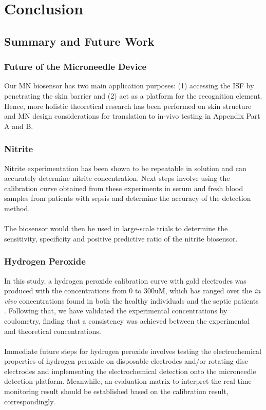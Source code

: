 \section{Conclusion}
\subsection{Summary and Future Work}
\subsubsection{Future of the Microneedle Device}
Our MN biosensor has two main application purposes: (1) accessing the ISF by penetrating the skin barrier and (2) act as a platform for the recognition element.  Hence, more holistic theoretical research has been performed on skin structure and MN design considerations for translation to in-vivo testing in Appendix Part A and B.
\subsubsection{Nitrite}
 Nitrite experimentation has been shown to be repeatable in solution and can accurately determine nitrite concentration. Next steps involve using the calibration curve obtained from these experiments in serum and fresh blood samples from patients with sepsis and determine the accuracy of the detection method.\\\\
 The biosensor would then be used in large-scale trials to determine the sensitivity, specificity and positive predictive ratio of the nitrite biosensor.
\subsubsection{Hydrogen Peroxide}
In this study, a hydrogen peroxide calibration curve with gold electrodes was produced with the concentrations from 0 to 300uM, which has ranged over the \textit{in vivo}  concentrations found in both the healthy individuals and the septic patients \cite{FORMAN201648, VanAsbeck1995}. Following that, we have validated the experimental concentrations by coulometry, finding that a consistency was achieved between the experimental and theoretical concentrations. \\\\
Immediate future steps for hydrogen peroxide involves testing the electrochemical properties of hydrogen peroxide on disposable electrodes and/or rotating disc electrodes and implementing the electrochemical detection onto the microneedle detection platform. Meanwhile, an evaluation matrix to interpret the real-time monitoring result should be established based on the calibration result, correspondingly.

